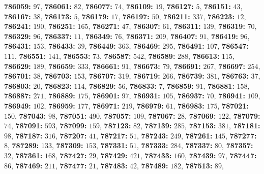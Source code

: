 \textsf{\bfseries 786059:} $97$, \textsf{\bfseries 786061:} $82$, \textsf{\bfseries 786077:} $74$, \textsf{\bfseries 786109:} $19$, \textsf{\bfseries 786127:} $5$, \textsf{\bfseries 786151:} $43$, \textsf{\bfseries 786167:} $38$, \textsf{\bfseries 786173:} $5$, \textsf{\bfseries 786179:} $17$, \textsf{\bfseries 786197:} $50$, \textsf{\bfseries 786211:} $337$, \textsf{\bfseries 786223:} $12$, \textsf{\bfseries 786241:} $190$, \textsf{\bfseries 786251:} $165$, \textsf{\bfseries 786271:} $47$, \textsf{\bfseries 786307:} $61$, \textsf{\bfseries 786311:} $139$, \textsf{\bfseries 786319:} $70$, \textsf{\bfseries 786329:} $96$, \textsf{\bfseries 786337:} $11$, \textsf{\bfseries 786349:} $76$, \textsf{\bfseries 786371:} $209$, \textsf{\bfseries 786407:} $91$, \textsf{\bfseries 786419:} $96$, \textsf{\bfseries 786431:} $153$, \textsf{\bfseries 786433:} $39$, \textsf{\bfseries 786449:} $363$, \textsf{\bfseries 786469:} $295$, \textsf{\bfseries 786491:} $107$, \textsf{\bfseries 786547:} $111$, \textsf{\bfseries 786551:} $141$, \textsf{\bfseries 786553:} $73$, \textsf{\bfseries 786587:} $542$, \textsf{\bfseries 786589:} $288$, \textsf{\bfseries 786613:} $115$, \textsf{\bfseries 786629:} $189$, \textsf{\bfseries 786659:} $333$, \textsf{\bfseries 786661:} $91$, \textsf{\bfseries 786673:} $79$, \textsf{\bfseries 786691:} $267$, \textsf{\bfseries 786697:} $254$, \textsf{\bfseries 786701:} $38$, \textsf{\bfseries 786703:} $153$, \textsf{\bfseries 786707:} $319$, \textsf{\bfseries 786719:} $266$, \textsf{\bfseries 786739:} $381$, \textsf{\bfseries 786763:} $37$, \textsf{\bfseries 786803:} $20$, \textsf{\bfseries 786823:} $114$, \textsf{\bfseries 786829:} $56$, \textsf{\bfseries 786833:} $7$, \textsf{\bfseries 786859:} $91$, \textsf{\bfseries 786881:} $158$, \textsf{\bfseries 786887:} $271$, \textsf{\bfseries 786889:} $175$, \textsf{\bfseries 786901:} $97$, \textsf{\bfseries 786931:} $105$, \textsf{\bfseries 786937:} $70$, \textsf{\bfseries 786941:} $109$, \textsf{\bfseries 786949:} $102$, \textsf{\bfseries 786959:} $177$, \textsf{\bfseries 786971:} $219$, \textsf{\bfseries 786979:} $61$, \textsf{\bfseries 786983:} $175$, \textsf{\bfseries 787021:} $150$, \textsf{\bfseries 787043:} $98$, \textsf{\bfseries 787051:} $490$, \textsf{\bfseries 787057:} $109$, \textsf{\bfseries 787067:} $28$, \textsf{\bfseries 787069:} $122$, \textsf{\bfseries 787079:} $74$, \textsf{\bfseries 787091:} $593$, \textsf{\bfseries 787099:} $159$, \textsf{\bfseries 787123:} $82$, \textsf{\bfseries 787139:} $285$, \textsf{\bfseries 787153:} $381$, \textsf{\bfseries 787181:} $98$, \textsf{\bfseries 787187:} $316$, \textsf{\bfseries 787207:} $41$, \textsf{\bfseries 787217:} $51$, \textsf{\bfseries 787243:} $249$, \textsf{\bfseries 787261:} $145$, \textsf{\bfseries 787277:} $8$, \textsf{\bfseries 787289:} $133$, \textsf{\bfseries 787309:} $153$, \textsf{\bfseries 787331:} $51$, \textsf{\bfseries 787333:} $284$, \textsf{\bfseries 787337:} $80$, \textsf{\bfseries 787357:} $32$, \textsf{\bfseries 787361:} $168$, \textsf{\bfseries 787427:} $29$, \textsf{\bfseries 787429:} $421$, \textsf{\bfseries 787433:} $160$, \textsf{\bfseries 787439:} $97$, \textsf{\bfseries 787447:} $86$, \textsf{\bfseries 787469:} $211$, \textsf{\bfseries 787477:} $21$, \textsf{\bfseries 787483:} $42$, \textsf{\bfseries 787489:} $182$, \textsf{\bfseries 787513:} $89$, 
